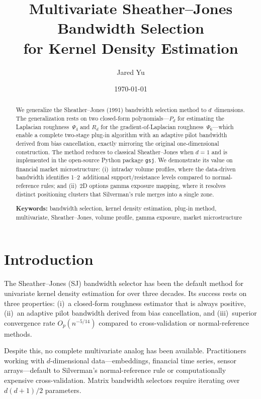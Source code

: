 \documentclass[12pt]{article}
\title{Multivariate Sheather--Jones Bandwidth Selection\\for Kernel Density Estimation}
\author{Jared Yu}
\date{\today}
\begin{document}
\maketitle

\begin{abstract}
We generalize the Sheather--Jones (1991) bandwidth selection method to $d$~dimensions. The generalization rests on two closed-form polynomials---$P_d$ for estimating the Laplacian roughness~$\Psi_4$ and $R_d$ for the gradient-of-Laplacian roughness~$\Psi_6$---which enable a complete two-stage plug-in algorithm with an adaptive pilot bandwidth derived from bias cancellation, exactly mirroring the original one-dimensional construction. The method reduces to classical Sheather--Jones when $d=1$ and is implemented in the open-source Python package \texttt{gsj}. We demonstrate its value on financial market microstructure: (i)~intraday volume profiles, where the data-driven bandwidth identifies 1--2~additional support/resistance levels compared to normal-reference rules; and (ii)~2D options gamma exposure mapping, where it resolves distinct positioning clusters that Silverman's rule merges into a single zone.

\medskip
\noindent\textbf{Keywords:} bandwidth selection, kernel density estimation, plug-in method, multivariate, Sheather--Jones, volume profile, gamma exposure, market microstructure
\end{abstract}

\section{Introduction}
\label{sec:intro}

The Sheather--Jones (SJ) bandwidth selector \citep{sheather1991} has been the default method for univariate kernel density estimation for over three decades. Its success rests on three properties: (i)~a closed-form roughness estimator that is always positive, (ii)~an adaptive pilot bandwidth derived from bias cancellation, and (iii)~superior convergence rate $O_p(n^{-5/14})$ compared to cross-validation or normal-reference methods.

Despite this, no complete multivariate analog has been available. Practitioners working with $d$-dimensional data---embeddings, financial time series, sensor arrays---default to Silverman's normal-reference rule \citep{silverman1986} or computationally expensive cross-validation. Matrix bandwidth selectors \citep{chacon2010} require iterating over $d(d+1)/2$ parameters.
\end{document}
